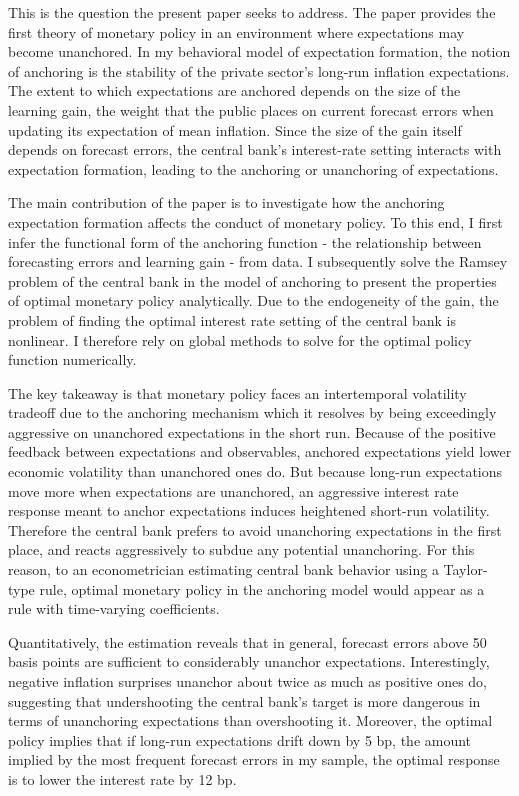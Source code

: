 \documentclass[11pt]{article}
\renewcommand{\[}{\begin{equation}}
\renewcommand{\]}{\end{equation}}
\def\movepibar{5 }
\def\movei{12 }
\begin{document}
This is the question the present paper seeks to address. The paper provides the first theory of monetary policy in an environment where expectations may become unanchored. In my behavioral model of expectation formation, the notion of anchoring is the stability of the private sector's long-run inflation expectations. The extent to which expectations are anchored depends on the size of the learning gain, the weight that the public places on current forecast errors when updating its expectation of mean inflation. Since the size of the gain itself depends on forecast errors, the central bank's interest-rate setting interacts with expectation formation, leading to the anchoring or unanchoring of expectations.

The main contribution of the paper is to investigate how the anchoring expectation formation affects the conduct of monetary policy. To this end, I first infer the functional form of the anchoring function - the relationship between forecasting errors and learning gain -  from data. I subsequently solve the Ramsey problem of the central bank in the model of anchoring to present the properties of optimal monetary policy analytically. Due to the endogeneity of the gain, the problem of finding the optimal interest rate setting of the central bank is nonlinear. I therefore rely on global methods to solve for the optimal policy function numerically.

The key takeaway is that monetary policy faces an intertemporal volatility tradeoff due to the anchoring mechanism which it resolves by being exceedingly aggressive on unanchored expectations in the short run. Because of the positive feedback between expectations and observables, anchored expectations yield lower economic volatility than unanchored ones do. But because long-run expectations move more when expectations are unanchored, an aggressive interest rate response meant to anchor expectations induces heightened short-run volatility. Therefore the central bank prefers to avoid unanchoring expectations in the first place, and reacts aggressively to subdue any potential unanchoring. For this reason, to an econometrician estimating central bank behavior using a Taylor-type rule, optimal monetary policy in the anchoring model would appear as a rule with time-varying coefficients. 

Quantitatively, the estimation reveals that in general, forecast errors above 50 basis points are sufficient to considerably unanchor expectations. Interestingly, negative inflation surprises unanchor about twice as much as positive ones do, suggesting that undershooting the central bank's target is more dangerous in terms of unanchoring expectations than overshooting it. Moreover, the optimal policy implies that if long-run expectations drift down by \movepibar bp, the amount implied by the most frequent forecast errors in my sample, the optimal response is to lower the interest rate by \movei bp.
\end{document}
